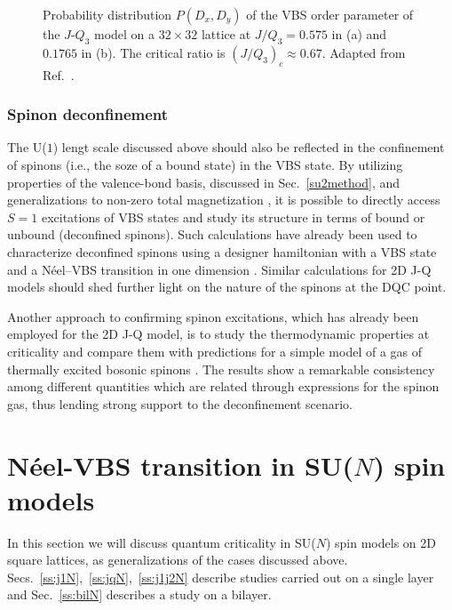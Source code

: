 \documentclass[range]{ar2e}
\begin{document}
\begin{figure}
\centerline{}
  \caption{Probability distribution $P(D_x,D_y)$ of the VBS order parameter of the $J$-$Q_3$ model on a $32\times 32$
           lattice at $J/Q_3 = 0.575$ in (a) and $0.1765$ in (b). The critical ratio is $(J/Q_3)_c \approx 0.67$. Adapted
           from Ref.~\cite{lou2009:sun}.}  
\label{jq3histo}
\end{figure}

\subsubsection{Spinon deconfinement}

The U($1$) lengt scale discussed above should also be reflected in the confinement of spinons (i.e., the soze of a bound state) in the VBS state. By utilizing 
properties of the valence-bond basis, discussed in Sec.~\ref{su2method}, and generalizations to non-zero total magnetization \cite{Banerjee10b,Wang10}, it is 
possible to directly access $S=1$ excitations of VBS states and study its structure in terms of bound or unbound (deconfined spinons). Such calculations have 
already been used to characterize deconfined spinons using a designer hamiltonian with a VBS state and a N\'eel--VBS transition in one dimension \cite{Tang11a}. 
Similar calculations for 2D J-Q models should shed further light on the nature of the spinons at the DQC point.

Another approach to confirming spinon excitations, which has already been employed for the 2D J-Q model, is to study the thermodynamic properties at 
criticality and compare them with predictions for a simple model of a gas of thermally excited bosonic spinons \cite{Sandvik11a}. The results show a remarkable 
consistency among different quantities which are related through expressions for the spinon gas, thus lending strong support to the deconfinement scenario.

\section{N\'eel-VBS transition in SU($N$) spin models}
\label{sec:sunmodels}

In this section we will discuss quantum criticality in SU($N$) spin models on 2D square lattices, as generalizations of the cases discussed above. 
Secs.~\ref{ss:j1N},~\ref{ss:jqN},~\ref{ss:j1j2N} describe studies carried out on a single layer and Sec.~\ref{ss:bilN} describes a study on a bilayer. 
\end{document}
